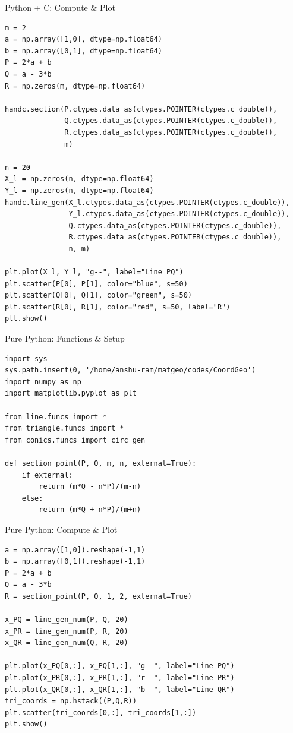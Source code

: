\documentclass{beamer}
\begin{document}
\begin{frame}[fragile]{Python + C: Compute \& Plot}
\begin{lstlisting}[style=PyStyle]
m = 2
a = np.array([1,0], dtype=np.float64)
b = np.array([0,1], dtype=np.float64)
P = 2*a + b
Q = a - 3*b
R = np.zeros(m, dtype=np.float64)

handc.section(P.ctypes.data_as(ctypes.POINTER(ctypes.c_double)),
              Q.ctypes.data_as(ctypes.POINTER(ctypes.c_double)),
              R.ctypes.data_as(ctypes.POINTER(ctypes.c_double)),
              m)

n = 20
X_l = np.zeros(n, dtype=np.float64)
Y_l = np.zeros(n, dtype=np.float64)
handc.line_gen(X_l.ctypes.data_as(ctypes.POINTER(ctypes.c_double)),
               Y_l.ctypes.data_as(ctypes.POINTER(ctypes.c_double)),
               Q.ctypes.data_as(ctypes.POINTER(ctypes.c_double)),
               R.ctypes.data_as(ctypes.POINTER(ctypes.c_double)),
               n, m)

plt.plot(X_l, Y_l, "g--", label="Line PQ")
plt.scatter(P[0], P[1], color="blue", s=50)
plt.scatter(Q[0], Q[1], color="green", s=50)
plt.scatter(R[0], R[1], color="red", s=50, label="R")
plt.show()
\end{lstlisting}
\end{frame}

\begin{frame}[fragile]{Pure Python: Functions \& Setup}
\begin{lstlisting}[style=PyStyle]
import sys
sys.path.insert(0, '/home/anshu-ram/matgeo/codes/CoordGeo')
import numpy as np
import matplotlib.pyplot as plt

from line.funcs import *
from triangle.funcs import *
from conics.funcs import circ_gen

def section_point(P, Q, m, n, external=True):
    if external:
        return (m*Q - n*P)/(m-n)
    else:
        return (m*Q + n*P)/(m+n)
\end{lstlisting}
\end{frame}

\begin{frame}[fragile]{Pure Python: Compute \& Plot}
\begin{lstlisting}[style=PyStyle]
a = np.array([1,0]).reshape(-1,1)
b = np.array([0,1]).reshape(-1,1)
P = 2*a + b
Q = a - 3*b
R = section_point(P, Q, 1, 2, external=True)

x_PQ = line_gen_num(P, Q, 20)
x_PR = line_gen_num(P, R, 20)
x_QR = line_gen_num(Q, R, 20)

plt.plot(x_PQ[0,:], x_PQ[1,:], "g--", label="Line PQ")
plt.plot(x_PR[0,:], x_PR[1,:], "r--", label="Line PR")
plt.plot(x_QR[0,:], x_QR[1,:], "b--", label="Line QR")
tri_coords = np.hstack((P,Q,R))
plt.scatter(tri_coords[0,:], tri_coords[1,:])
plt.show()
\end{lstlisting}
\end{frame}
\end{document}
